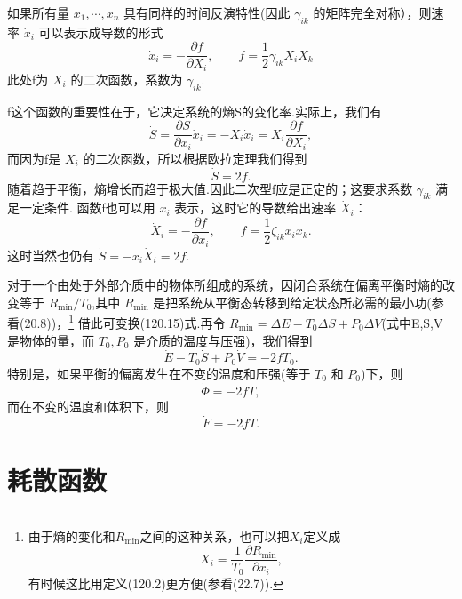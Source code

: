 如果所有量 $x_1,\cdots,x_n$ 具有同样的时间反演特性(因此 $\gamma_{ik}$ 的矩阵完全对称），则速率 $\dot{x}_i$ 可以表示成导数的形式
\begin{equation}
  \dot{x}_i=-\frac{\partial f}{\partial X_i},\qquad
  f=\frac{1}{2}\gamma_{ik}X_iX_k
\end{equation}
此处f为 $X_i$ 的二次函数，系数为 $\gamma_{ik}$.

f这个函数的重要性在于，它决定系统的熵S的变化率.实际上，我们有
\begin{equation*}
  \dot{S}=\frac{\partial S}{\partial x_i}\dot{x}_i
  =-X_i\dot{x}_i=X_i\frac{\partial f}{\partial X_i},
\end{equation*}
而因为f是 $X_i$ 的二次函数，所以根据欧拉定理我们得到
\begin{equation}
  \dot{S}=2f.
\end{equation}
随着趋于平衡，熵增长而趋于极大值.因此二次型f应是正定的；这要求系数 $\gamma_{ik}$ 满足一定条件. 函数f也可以用 $x_i$ 表示，这时它的导数给出速率 $\dot{X}_i$：
\begin{equation}
  \dot{X}_i=-\frac{\partial f}{\partial x_i},\qquad
  f=\frac{1}{2}\zeta_{ik}x_ix_k.
\end{equation}
这时当然也仍有 $\dot{S}=-x_i\dot{X}_i=2f$.

对于一个由处于外部介质中的物体所组成的系统，因闭合系统在偏离平衡时熵的改变等于 $R_{\min}/T_0$,其中 $R_{\min}$ 是把系统从平衡态转移到给定状态所必需的最小功(参看(20.8))，\footnote{由于熵的变化和$R_{\min}$之间的这种关系，也可以把$X_i$定义成
\begin{equation}
  X_i=\frac{1}{T_0}\frac{\partial R_{\min}}{\partial x_i},\tag{120.2a}
\end{equation}
有时候这比用定义(120.2)更方便(参看(22.7)).} 借此可变换(120.15)式.再令 $R_{\min}=\Delta E-T_0\Delta S+P_0\Delta V$(式中E,S,V是物体的量，而 $T_0,P_0$ 是介质的温度与压强)，我们得到
\begin{equation}
  \dot{E}-T_0\dot{S}+P_0\dot{V}=-2fT_0.
\end{equation}
特别是，如果平衡的偏离发生在不变的温度和压强(等于 $T_0$ 和 $P_0$)下，则
\begin{equation}
  \dot{\Phi}=-2fT,
\end{equation}
而在不变的温度和体积下，则
\begin{equation}
  \dot{F}=-2fT.
\end{equation}

\section{耗散函数}

